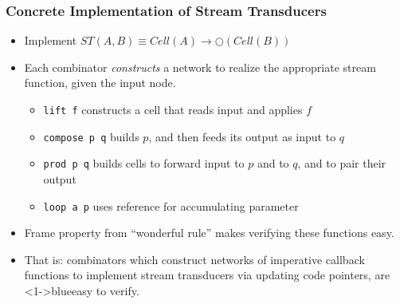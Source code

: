 \documentclass[svgnames]{beamer}
\newcommand{\blue}[2]{{\color<{#1}>{blue}{#2}}}
\begin{document}
\begin{frame}
  \frametitle{Concrete Implementation of Stream Transducers}

  \begin{itemize}
    \item Implement $ST(A,B) \equiv Cell(A) \to \bigcirc(Cell(B))$

    \item Each combinator \emph{constructs} a network to realize the
      appropriate stream function, given the input node. 
      \begin{itemize}
        \item \texttt{lift f} constructs a cell that reads input and applies $f$
        \item \texttt{compose p q} builds $p$, and then feeds its output as input to $q$
        \item \texttt{prod p q} builds cells to forward input to $p$ and to $q$, and to pair their output
        \item \texttt{loop a p} uses reference for accumulating parameter
      \end{itemize}

    \item Frame property from ``wonderful rule'' makes verifying 
      these functions easy. 

    \item That is: combinators which construct networks of imperative
      callback functions to implement stream transducers via
      updating code pointers, are \blue{1-}{easy to verify}.
  \end{itemize}
\end{frame}
\end{document}
